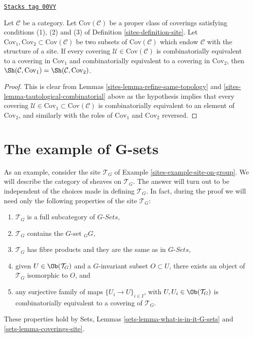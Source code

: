 \begin{lemma}
\label{sites-lemma-choice-set-coverings-immaterial}
\href{https://stacks.math.columbia.edu/tag/00VY}{\texttt{Stacks tag 00VY}}

Let $\mathcal{C}$ be a category.
Let $\text{Cov}(\mathcal{C})$ be a proper class of coverings
satisfying conditions (1), (2) and (3) of Definition \ref{sites-definition-site}.
Let $\text{Cov}_1, \text{Cov}_2 \subset \text{Cov}(\mathcal{C})$
be two subsets of $\text{Cov}(\mathcal{C})$ which endow
$\mathcal{C}$ with the structure of a site. If
every covering $\mathcal{U} \in \text{Cov}(\mathcal{C})$
is combinatorially equivalent to a covering in
$\text{Cov}_1$ and combinatorially equivalent to a
covering in $\text{Cov}_2$, then
$\Sh(\mathcal{C}, \text{Cov}_1) =
\Sh(\mathcal{C}, \text{Cov}_2)$.
\end{lemma}

\begin{proof}

This is clear from Lemmas \ref{sites-lemma-refine-same-topology}
and \ref{sites-lemma-tautological-combinatorial} above as the hypothesis
implies that every covering
$\mathcal{U} \in \text{Cov}_1 \subset \text{Cov}(\mathcal{C})$
is combinatorially equivalent to an element of $\text{Cov}_2$,
and similarly with the roles of $\text{Cov}_1$ and $\text{Cov}_2$
reversed.
\end{proof}

\section{The example of G-sets}
\label{sites-section-example-sheaf-G-sets}
As an example, consider the site $\mathcal{T}_G$ of
Example \ref{sites-example-site-on-group}. We will describe the
category of sheaves on $\mathcal{T}_G$. The answer will turn
out to be independent of the choices made in defining $\mathcal{T}_G$.
In fact, during the proof we will need only the following
properties of the site $\mathcal{T}_G$:
\begin{enumerate}
\item[(a)] $\mathcal{T}_G$ is a full subcategory of $G\textit{-Sets}$,
\item[(b)] $\mathcal{T}_G$ contains the $G$-set ${}_GG$,
\item[(c)] $\mathcal{T}_G$ has fibre products and they are the same as
in $G\textit{-Sets}$,
\item[(d)] given $U \in \Ob(\mathcal{T}_G)$ and a $G$-invariant
subset $O \subset U$, there exists an object of $\mathcal{T}_G$ isomorphic
to $O$, and
\item[(e)] any surjective family of maps $\{U_i \to U\}_{i \in I}$, with
$U, U_i \in \Ob(\mathcal{T}_G)$ is combinatorially equivalent to a
covering of $\mathcal{T}_G$.
\end{enumerate}
These properties hold by Sets, Lemmas \ref{sets-lemma-what-is-in-it-G-sets}
and \ref{sets-lemma-coverings-site}.

